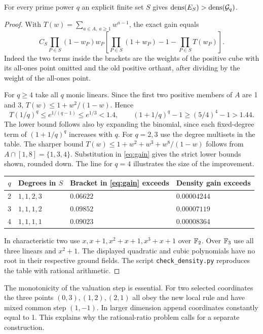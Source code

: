 \documentclass[11pt]{article}
\begin{document}
\begin{theorem}
For every prime power $q$ an explicit finite set $S$ gives $\operatorname{dens}(E_S)>\operatorname{dens}(\mathcal G_q)$.
\end{theorem}
\begin{proof}
With $T(w)=\sum_{a\in A,\ a\ge1}w^{a-1}$, the exact gain equals
\begin{equation}
 C_S\prod_{P\in S}(1-w_P)w_P
 \left[\prod_{P\in S}(1+w_P)-1-\prod_{P\in S}T(w_P)\right].
 \label{eq:gain}
\end{equation}
Indeed the two terms inside the brackets are the weights of the positive cube with its all-ones point omitted and the old positive orthant, after dividing by the weight of the all-ones point.

For $q\ge4$ take all $q$ monic linears. Since the first two positive members of $A$ are 1 and 3, $T(w)\le1+w^2/(1-w)$. Hence
\[
 T(1/q)^q\le e^{1/(q-1)}\le e^{1/3}<1.4,\qquad
 (1+1/q)^q-1\ge (5/4)^4-1>1.44.
\]
The lower bound follows also by expanding the binomial, since each fixed-degree term of $(1+1/q)^q$ increases with $q$. For $q=2,3$ use the degree multisets in the table. The sharper bound
$T(w)\le 1+w^2+w^3+w^8/(1-w)$ follows from $A\cap[1,8]=\{1,3,4\}$. Substitution in \eqref{eq:gain} gives the strict lower bounds shown, rounded down. The line for $q=4$ illustrates the size of the improvement.
\begin{center}
\begin{tabular}{@{}clll@{}}\toprule
$q$ & Degrees in $S$ & Bracket in \eqref{eq:gain} exceeds & Density gain exceeds\\\midrule
2 & $1,1,2,3$ & $0.06622$ & $0.00004244$\\
3 & $1,1,1,2$ & $0.09852$ & $0.00007119$\\
4 & $1,1,1,1$ & $0.09023$ & $0.00008364$\\\bottomrule
\end{tabular}
\end{center}
In characteristic two use $x,x+1,x^2+x+1,x^3+x+1$ over $\mathbb F_2$. Over $\mathbb F_3$ use all three linears and $x^2+1$. The displayed quadratic and cubic polynomials have no root in their respective ground fields. The script \texttt{check\_density.py} reproduces the table with rational arithmetic.
\end{proof}
The monotonicity of the valuation step is essential. For two selected coordinates the three points $(0,3),(1,2),(2,1)$ all obey the new local rule and have mixed common step $(1,-1)$. In larger dimension append coordinates constantly equal to 1. This explains why the rational-ratio problem calls for a separate construction.
\end{document}
